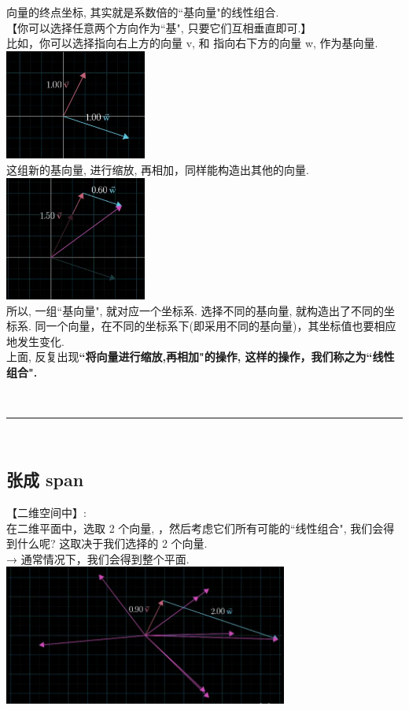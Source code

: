 \documentclass[UTF8]{ctexart}
\begin{document}
向量的终点坐标, 其实就是系数倍的``基向量"的线性组合.\\



【你可以选择任意两个方向作为``基", 只要它们互相垂直即可.】 \\
比如，你可以选择指向右上方的向量 v, 和 指向右下方的向量 w, 作为基向量. \\
\includegraphics[width=0.35\textwidth]{img/0102.png}\\

这组新的基向量, 进行缩放, 再相加，同样能构造出其他的向量.\\
\includegraphics[width=0.35\textwidth]{img/0103.png}\\

所以, 一组``基向量", 就对应一个坐标系. 选择不同的基向量, 就构造出了不同的坐标系. 同一个向量，在不同的坐标系下(即采用不同的基向量)，其坐标值也要相应地发生变化. \\

上面, 反复出现\textbf{``将向量进行缩放,再相加"的操作, 这样的操作，我们称之为``线性组合".}


~\\
\hrule
~\\

\subsection{张成 span}

【二维空间中】:\\
在二维平面中，选取 2 个向量, ，然后考虑它们所有可能的``线性组合", 我们会得到什么呢? 这取决于我们选择的 2 个向量.\\

→ 通常情况下，我们会得到整个平面.\\
\includegraphics[width=0.7\textwidth]{img/0104.png}\\
\end{document}
